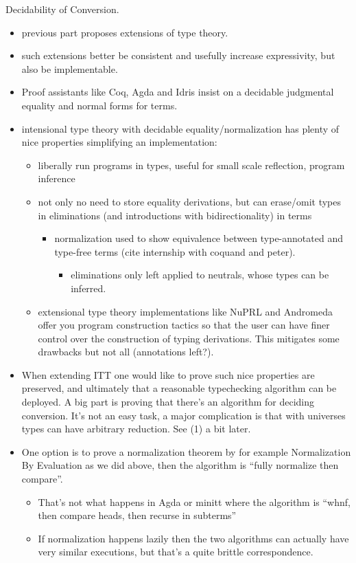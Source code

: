 \documentclass{book}
\begin{document}
Decidability of Conversion.
\begin{itemize}
 \item previous part proposes extensions of type theory.
 \item such extensions better be consistent and usefully increase expressivity, but also be implementable.
 \item Proof assistants like Coq, Agda and Idris insist on a decidable judgmental equality and normal forms for terms.
 \item intensional type theory with decidable equality/normalization has plenty of nice properties simplifying an implementation:
   \begin{itemize}
   \item liberally run programs in types, useful for small scale reflection, program inference
   \item not only no need to store equality derivations, but can erase/omit types in eliminations (and introductions with bidirectionality) in terms
     \begin{itemize}
     \item normalization used to show equivalence between type-annotated and type-free terms (cite internship with coquand and peter).
         \begin{itemize}
         \item eliminations only left applied to neutrals, whose types can be inferred.
         \end{itemize}
     \end{itemize}

   \item extensional type theory implementations like NuPRL and Andromeda
   offer you program construction tactics so that the user can have finer control over the construction of typing derivations.
   This mitigates some drawbacks but not all (annotations left?).
   \end{itemize}

 \item When extending ITT one would like to prove such nice properties are
 preserved, and ultimately that a reasonable typechecking algorithm
 can be deployed. A big part is proving that there's an algorithm for
 deciding conversion. It's not an easy task, a major complication is that with universes types can have arbitrary reduction. See (1) a bit later.

 \item One option is to prove a normalization theorem by for example
   Normalization By Evaluation as we did above, then the algorithm is ``fully normalize then compare''.
   \begin{itemize}
   \item That's not what happens in Agda or minitt where the algorithm is ``whnf, then compare heads, then recurse in subterms''
   \item If normalization happens lazily then the two algorithms can actually have very similar executions, but that's a quite brittle correspondence.


\end{itemize}
\end{itemize}
\end{document}
